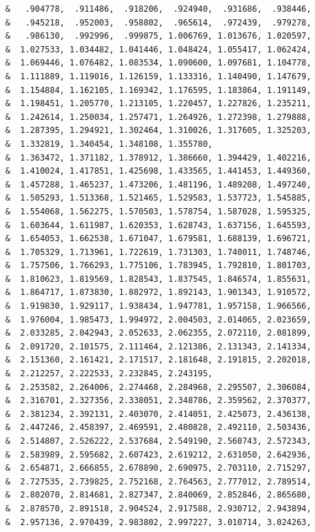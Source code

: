 \begin{lstlisting}
     &   .904778,  .911486,  .918206,  .924940,  .931686,  .938446,
     &   .945218,  .952003,  .958802,  .965614,  .972439,  .979278,
     &   .986130,  .992996,  .999875, 1.006769, 1.013676, 1.020597,
     &  1.027533, 1.034482, 1.041446, 1.048424, 1.055417, 1.062424,
     &  1.069446, 1.076482, 1.083534, 1.090600, 1.097681, 1.104778,
     &  1.111889, 1.119016, 1.126159, 1.133316, 1.140490, 1.147679,
     &  1.154884, 1.162105, 1.169342, 1.176595, 1.183864, 1.191149,
     &  1.198451, 1.205770, 1.213105, 1.220457, 1.227826, 1.235211,
     &  1.242614, 1.250034, 1.257471, 1.264926, 1.272398, 1.279888,
     &  1.287395, 1.294921, 1.302464, 1.310026, 1.317605, 1.325203,
     &  1.332819, 1.340454, 1.348108, 1.355780,
     &  1.363472, 1.371182, 1.378912, 1.386660, 1.394429, 1.402216,
     &  1.410024, 1.417851, 1.425698, 1.433565, 1.441453, 1.449360,
     &  1.457288, 1.465237, 1.473206, 1.481196, 1.489208, 1.497240,
     &  1.505293, 1.513368, 1.521465, 1.529583, 1.537723, 1.545885,
     &  1.554068, 1.562275, 1.570503, 1.578754, 1.587028, 1.595325,
     &  1.603644, 1.611987, 1.620353, 1.628743, 1.637156, 1.645593,
     &  1.654053, 1.662538, 1.671047, 1.679581, 1.688139, 1.696721,
     &  1.705329, 1.713961, 1.722619, 1.731303, 1.740011, 1.748746,
     &  1.757506, 1.766293, 1.775106, 1.783945, 1.792810, 1.801703,
     &  1.810623, 1.819569, 1.828543, 1.837545, 1.846574, 1.855631,
     &  1.864717, 1.873830, 1.882972, 1.892143, 1.901343, 1.910572,
     &  1.919830, 1.929117, 1.938434, 1.947781, 1.957158, 1.966566,
     &  1.976004, 1.985473, 1.994972, 2.004503, 2.014065, 2.023659,
     &  2.033285, 2.042943, 2.052633, 2.062355, 2.072110, 2.081899,
     &  2.091720, 2.101575, 2.111464, 2.121386, 2.131343, 2.141334,
     &  2.151360, 2.161421, 2.171517, 2.181648, 2.191815, 2.202018,
     &  2.212257, 2.222533, 2.232845, 2.243195,
     &  2.253582, 2.264006, 2.274468, 2.284968, 2.295507, 2.306084,
     &  2.316701, 2.327356, 2.338051, 2.348786, 2.359562, 2.370377,
     &  2.381234, 2.392131, 2.403070, 2.414051, 2.425073, 2.436138,
     &  2.447246, 2.458397, 2.469591, 2.480828, 2.492110, 2.503436,
     &  2.514807, 2.526222, 2.537684, 2.549190, 2.560743, 2.572343,
     &  2.583989, 2.595682, 2.607423, 2.619212, 2.631050, 2.642936,
     &  2.654871, 2.666855, 2.678890, 2.690975, 2.703110, 2.715297,
     &  2.727535, 2.739825, 2.752168, 2.764563, 2.777012, 2.789514,
     &  2.802070, 2.814681, 2.827347, 2.840069, 2.852846, 2.865680,
     &  2.878570, 2.891518, 2.904524, 2.917588, 2.930712, 2.943894,
     &  2.957136, 2.970439, 2.983802, 2.997227, 3.010714, 3.024263,

\end{lstlisting}

